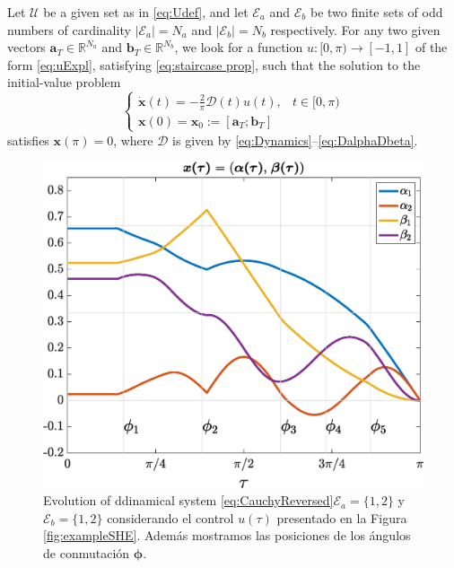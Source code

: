 \documentclass[twocolumn]{autart}    %
\begin{document}
\medskip

\begin{problem}\label{pb:SHEpControl}
    Let $\mathcal{U}$ be a given set as in \eqref{eq:Udef},  and let $\mathcal{E} _a $ and $\mathcal{E} _b $ be two finite sets of odd numbers of cardinality $|\mathcal{E}_a| = N_a $ and $ |\mathcal{E} _b| = N_b$ respectively.
    For any two given vectors $\bm{a}_T \in \mathbb{R}^{N_a}$ and $\bm{b}_T \in \mathbb{R}^{N_b} $,  we look for a function $u: [0,\pi)\to [-1,1]$ of the form \eqref{eq:uExpl}, satisfying \eqref{eq:staircase prop}, such that the solution to the initial-value problem
    \begin{equation}\label{eq:CauchyReversed}
    \begin{cases}
        \displaystyle\dot{\bm{x}}(t) = -\frac 2\pi\bm{\mathcal{D}}(t)u(t),  & t \in [0,\pi)
        \\[6pt]
        \bm{x}(0) = \bm{x}_0 := [\bm{a}_T; \bm{b}_T]
    \end{cases}
\end{equation}
satisfies $\bm{x} (\pi) = 0$, where $\bm{\mathcal{D}}$ is given by \eqref{eq:Dynamics}--\eqref{eq:DalphaDbeta}.
\end{problem}


\begin{figure}[ht!] 
    \centering
    \includegraphics[scale=0.325]{img/fig02.eps}
    \caption{Evolution of ddinamical system \eqref{eq:CauchyReversed}$\mathcal{E}_a = \{1,2\}$ y $\mathcal{E}_b = \{1,2\}$ considerando el control $u(\tau)$ presentado en la Figura \ref{fig:exampleSHE}. Además mostramos las posiciones de los ángulos de conmutación $\bm{\phi}$.}
\end{figure}
\end{document}
